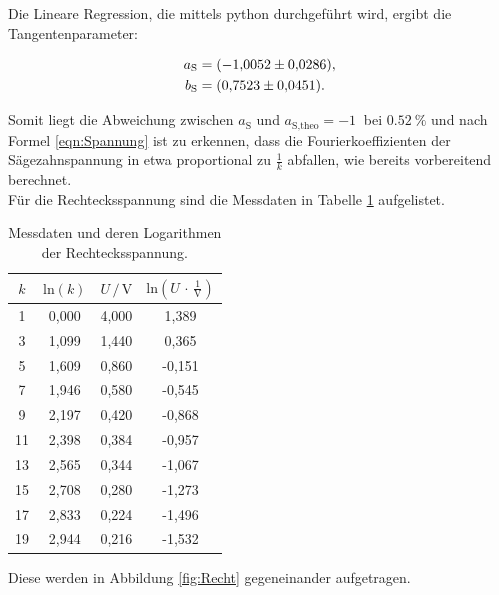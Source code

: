 Die Lineare Regression, die mittels python durchgeführt wird, ergibt die Tangentenparameter:

\begin{align*}
    a_\text{S} &= \SI{-1.0052 \pm 0.0286}{}, \\
    b_\text{S} &= \SI{0.7523 \pm 0.0451}{}.
\end{align*}

Somit liegt die Abweichung zwischen $a_\text{S}$ und $a_\text{S,theo} = \SI{-1}{}$ bei $\SI{0.52}{\percent}$ und
nach Formel \eqref{eqn:Spannung} ist zu erkennen, dass die Fourierkoeffizienten der Sägezahnspannung in etwa
proportional zu $\frac{1}{k}$ abfallen, wie bereits vorbereitend berechnet.
\\
Für die Rechtecksspannung sind die Messdaten in Tabelle \ref{tab:Messdaten2} aufgelistet.

\begin{table}[H]
    \centering
    \caption{Messdaten und deren Logarithmen der Rechtecksspannung.}
    \label{tab:Messdaten2}
    \begin{tabular}{c c c c}
    \toprule
    $k$ & $\text{ln} (k)$ & $U \,/\, \si{\volt}$ & $\text{ln}(U \, \cdot \, \frac{1}{\si{\volt}})$ \\
    \midrule
    1 & 0,000 & 4,000 &  1,389 \\
    3 & 1,099 & 1,440 &  0,365 \\
    5 & 1,609 & 0,860 & -0,151 \\
    7 & 1,946 & 0,580 & -0,545 \\
    9 & 2,197 & 0,420 & -0,868 \\
   11 & 2,398 & 0,384 & -0,957 \\
   13 & 2,565 & 0,344 & -1,067 \\
   15 & 2,708 & 0,280 & -1,273 \\
   17 & 2,833 & 0,224 & -1,496 \\
   19 & 2,944 & 0,216 & -1,532 \\
    \bottomrule
    \end{tabular}
\end{table} 

Diese werden in Abbildung \ref{fig:Recht} gegeneinander aufgetragen. 

